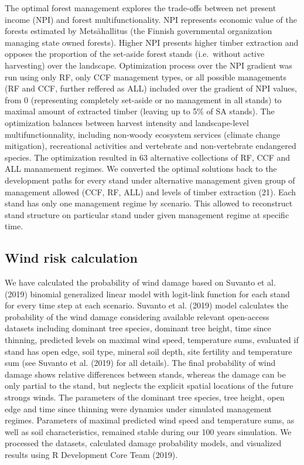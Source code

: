 \documentclass[]{elsarticle} %
\begin{document}
The optimal forest management explores the trade-offs between net present income (NPI) and forest multifunctionality. NPI represents economic value of the forests estimated by Metsähallitus (the Finnish governmental organization managing state owned forests). Higher NPI presents higher timber extraction and opposes the proportion of the set-aside forest stands (i.e.~without active harvesting) over the landscape. Optimization process over the NPI gradient was run using only RF, only CCF management types, or all possible managements (RF and CCF, further reffered as ALL) included over the gradient of NPI values, from 0 (representing completely set-aside or no management in all stands) to maximal amount of extracted timber (leaving up to 5\% of SA stands). The optimization balances between harvest intensity and landscape-level multifunctionnality, including non-woody ecosystem services (climate change mitigation), recreational activities and vertebrate and non-vertebrate endangered species. The optimization resulted in 63 alternative collections of RF, CCF and ALL manamement regimes. We converted the optimal solutions back to the development paths for every stand under alternative management given group of management allowed (CCF, RF, ALL) and levels of timber extraction (21). Each stand has only one management regime by scenario. This allowed to reconstruct stand structure on particular stand under given management regime at specific time.

\hypertarget{wind-risk-calculation}{%
\subsection{Wind risk calculation}\label{wind-risk-calculation}}

We have calculated the probability of wind damage based on Suvanto et al. (2019) binomial generalized linear model with logit-link function for each stand for every time step at each scenario. Suvanto et al. (2019) model calculates the probability of the wind damage considering available relevant open-access datasets including dominant tree species, dominant tree height, time since thinning, predicted levels on maximal wind speed, temperature sums, evaluated if stand has open edge, soil type, mineral soil depth, site fertility and temperature sum (see Suvanto et al. (2019) for all details). The final probability of wind damage shows relative differences between stands, whereas the damage can be only partial to the stand, but neglects the explicit spatial locations of the future strongs winds. The parameters of the dominant tree species, tree height, open edge and time since thinning were dynamics under simulated management regimes. Parameters of maximal predicted wind speed and temperature sums, as well as soil characteristics, remained stable during our 100 years simulation. We processed the datasets, calculated damage probability models, and visualized results using R Development Core Team (2019).
\end{document}
